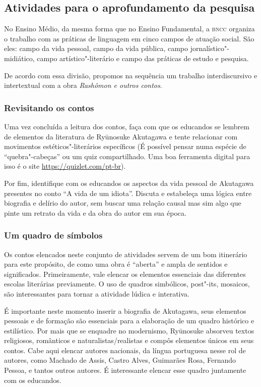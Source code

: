 \documentclass[12pt]{extarticle}
\begin{document}
\subsection{Atividades para o aprofundamento da pesquisa}


No Ensino Médio, da mesma forma que no Ensino Fundamental, a \textsc{bncc}
organiza o trabalho com as práticas de linguagem em cinco campos de
atuação social. São eles: campo da vida pessoal, campo da vida pública, campo
jornalístico"-midiático, campo artístico"-literário e campo das práticas de
estudo e pesquisa.

De acordo com essa divisão, propomos na sequência um trabalho interdiscursivo e
intertextual com a obra \emph{Rashômon e outros contos}.

\subsubsection{Revisitando os contos}

Uma vez concluída a leitura dos contos, faça com que os educandos se lembrem de
elementos da literatura de Ryūnosuke Akutagawa 
e tente relacionar com movimentos estéticos"-literários específicos
(É possível pensar numa espécie de ``quebra"-cabeças'' ou um quiz 
compartilhado. Uma boa ferramenta digital para isso é o site 
\url{https://quizlet.com/pt-br}).

Por fim, identifique com os educandos os aspectos da vida pessoal de Akutagawa
presentes no conto ``A vida de um idiota''. Discuta e estabeleça uma lógica entre
biografia e delírio do autor, sem buscar uma relação causal mas sim algo 
que pinte um retrato da vida e da obra do autor em sua época. 

\subsubsection{Um quadro de símbolos}

Os contos elencados neste conjunto de atividades servem de um bom itinerário
para este propósito, de como uma obra é ``aberta'' e ampla de sentidos e
significados. Primeiramente, vale elencar os elementos essenciais das
diferentes escolas literárias previamente. O uso de quadros simbólicos,
post"-its, mosaicos, são interessantes para tornar a atividade lúdica e
interativa.

É importante neste momento inserir a biografia de Akutagawa, seus elementos
pessoais e de formação são essenciais para a elaboração de um quadro histórico
e estilístico. Por mais que se enquadre no modernismo, Ryūnosuke absorveu
textos religiosos, românticos e naturalistas/realistas e compôs elementos
únicos em seus contos. Cabe aqui elencar autores nacionais, da língua
portuguesa nesse rol de autores, como Machado de Assis, Castro Alves, Guimarães
Rosa, Fernando Pessoa, e tantos outros autores. É interessante elencar esse
quadro juntamente com os educandos.
\end{document}
